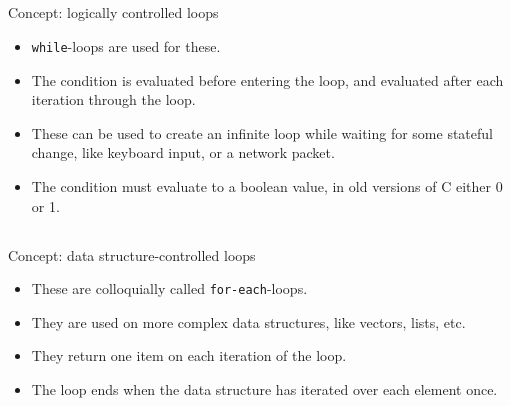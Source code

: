 \subsection{}
Concept: logically controlled loops

\begin{itemize}[noitemsep]
\item \texttt{while}-loops are used for these.
\item The condition is evaluated before entering the loop, and evaluated after each iteration through the loop.
\item These can be used to create an infinite loop while waiting for some stateful change, like keyboard input, or a network packet.
\item The condition must evaluate to a boolean value, in old versions of C either 0 or 1.
\end{itemize}

\subsection{}
Concept: data structure-controlled loops

\begin{itemize}[noitemsep]
\item These are colloquially called \texttt{for-each}-loops.
\item They are used on more complex data structures, like vectors, lists, etc.
\item They return one item on each iteration of the loop.
\item The loop ends when the data structure has iterated over each element once.
\end{itemize}

